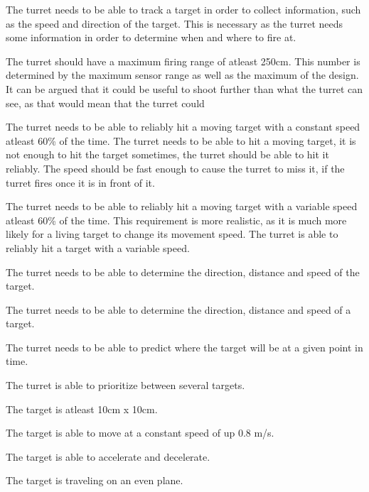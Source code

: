 The turret needs to be able to track a target in order to collect information,
such as the speed and direction of the target. This is necessary as the turret
needs some information in order to determine when and where to fire at.

The turret should have a maximum firing range of atleast 250cm. This number is
determined by the maximum sensor range as well as the maximum of the design. It
can be argued that it could be useful to shoot further than what the turret can
see, as that would mean that the turret could

The turret needs to be able to reliably hit a moving target with a
constant speed atleast 60\% of the time. The turret needs to be able to hit a
moving target, it is not enough to hit the target sometimes, the turret should
be able to hit it reliably. The speed should be fast enough to cause the turret
to miss it, if the turret fires once it is in front of it.

The turret needs to be able to reliably hit a moving target with a
variable speed atleast 60\% of the time. This requirement is more realistic, as
it is much more likely for a living target to change its movement speed.
The turret is able to reliably hit a target with a variable speed.

The turret needs to be able to determine the direction, distance and speed of
the target. 



The turret needs to be able to determine the direction, distance and speed of a target.

The turret needs to be able to predict where the target will be at a given point in time.

The turret is able to prioritize between several targets.





The target is atleast 10cm x 10cm.\nl

The target is able to move at a constant speed of up 0.8 m/s.\nl

The target is able to accelerate and decelerate.\nl

The target is traveling on an even plane.\nl
